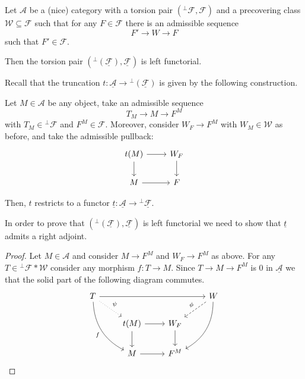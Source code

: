 \begin{lemma}
  Let $\mathcal{A}$ be a (nice) category with a torsion pair $(^\perp\mathcal{F}, \mathcal{F})$ and a precovering class
  $\mathcal{W}\subseteq \mathcal{F}$ such that for any $F\in\mathcal{F}$ there is an admissible
  sequence
  \begin{equation*}
    F'\to W\to F
  \end{equation*}
  such that $F'\in\mathcal{F}$.

  Then the torsion pair $(^\perp(\underline{\mathcal{F}}),\underline{\mathcal{F}})$ is left functorial.
\end{lemma}

Recall that the truncation $t:\underline{\mathcal{A}}\to {^\perp(\underline{\mathcal{F}})}$ is given by the following construction.

Let $M\in\mathcal{A}$ be any object, take an admissible sequence
\begin{equation*}
  T_M\to M\to F^M
\end{equation*}
with $T_M\in{^\perp\mathcal{F}}$ and $F^M\in\mathcal{F}$. Moreover, consider $W_F\to F^M$ with $W_M\in\mathcal{W}$
as before, and take the admissible pullback:
\begin{equation*}
  \begin{tikzcd}
    t(M)\arrow{d}\arrow{r}&W_F\arrow{d}\\
    M\arrow{r}&F
  \end{tikzcd}
\end{equation*}

Then, $t$ restricts to a functor $\underline{t}:\underline{\mathcal{A}}\to {^\perp\underline{\mathcal{F}}}$.

In order to prove that $(^\perp(\underline{\mathcal{F}}),\underline{\mathcal{F}})$ is left functorial we
need to show that $\underline{t}$ admits a right adjoint.

\begin{proof}
  Let $M\in\mathcal{A}$ and consider $M\to F^M$ and $W_F\to F^M$ as above.
  For any $T\in{^\perp\mathcal{F}\ast \mathcal{W}}$ consider any morphism
  $f:T\to M$. Since $T\to M\to F^M$ is 0 in $\underline{\mathcal{A}}$ we that the solid part of the
  following diagram commutes.
  \begin{equation*}
    \begin{tikzcd}
      T\arrow[bend right]{ddr}[']{f}\arrow{rrr}\arrow[dotted]{dr}{\psi}
        & & & W\arrow[dashed]{ld}[']{\phi}\arrow[bend left]{ddl}
              \\
        & t(M)\arrow{r}\arrow{d}
          & W_F\arrow{d}
            & \\
        & M\arrow{r}
          & F^M
            &
    \end{tikzcd}
  \end{equation*}
\end{proof}

